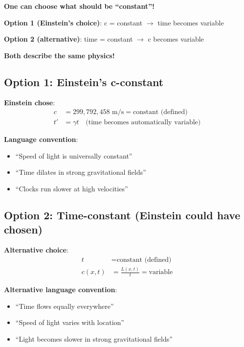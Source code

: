 	\begin{tcolorbox}[colback=orange!5!white,colframe=orange!75!black,title=The Fundamental Choice Option]
		\textbf{One can choose what should be ``constant''!}
		
		\textbf{Option 1 (Einstein's choice)}: c = constant $\rightarrow$ time becomes variable
		
		\textbf{Option 2 (alternative)}: time = constant $\rightarrow$ c becomes variable
		
		\textbf{Both describe the same physics!}
	\end{tcolorbox}
	
	\subsection{Option 1: Einstein's c-constant}
	
	\textbf{Einstein chose}:
	\begin{align}
		c &= 299,792,458 \text{ m/s} = \text{constant (defined)} \\
		t' &= \gamma t \quad \text{(time becomes automatically variable)}
	\end{align}
	
	\textbf{Language convention}:
	\begin{itemize}
		\item ``Speed of light is universally constant''
		\item ``Time dilates in strong gravitational fields''
		\item ``Clocks run slower at high velocities''
	\end{itemize}
	
	\subsection{Option 2: Time-constant (Einstein could have chosen)}
	
	\textbf{Alternative choice}:
	\begin{align}
		t &= \text{constant (defined)} \\
		c(x,t) &= \frac{L(x,t)}{t} = \text{variable}
	\end{align}
	
	\textbf{Alternative language convention}:
	\begin{itemize}
		\item ``Time flows equally everywhere''
		\item ``Speed of light varies with location''
		\item ``Light becomes slower in strong gravitational fields''
	\end{itemize}
	
